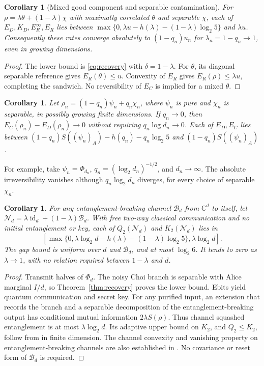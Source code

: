 \documentclass[11pt]{article}
\newtheorem{corollary}[theorem]{Corollary}
\newcommand{\id}{\operatorname{id}}
\begin{document}
\begin{corollary}[Mixed good component and separable contamination]\label{cor:mixedkey}
For $\rho=\lambda\theta+(1-\lambda)\chi$ with maximally correlated
$\theta$ and separable $\chi$, each of $E_D,K_D,E_R^\infty,E_R$ lies
between $\max\{0,\lambda u-h(\lambda)-(1-\lambda)\log_2 5\}$ and
$\lambda u$. Consequently these rates converge absolutely to
$(1-q_n)u_n$ for $\lambda_n=1-q_n\to1$, even in growing dimensions.
\end{corollary}
\begin{proof}
The lower bound is \eqref{eq:recovery} with $\delta=1-\lambda$.
For $\theta$, its diagonal separable reference gives $E_R(\theta)\le u$.
Convexity of $E_R$ gives $E_R(\rho)\le\lambda u$, completing the
sandwich. No reversibility of $E_C$ is implied for a mixed $\theta$.
\end{proof}

\begin{corollary}\label{cor:separable}
Let $\rho_n=(1-q_n)\psi_n+q_n\chi_n$, where $\psi_n$ is pure and
$\chi_n$ is separable, in possibly growing finite dimensions. If
$q_n\to0$, then $E_C(\rho_n)-E_D(\rho_n)\to0$ without requiring
$q_n\log d_n\to0$. Each of $E_D,E_C$ lies between
$(1-q_n)S((\psi_n)_A)-h(q_n)-q_n\log_2 5$ and
$(1-q_n)S((\psi_n)_A)$.
\end{corollary}
For example, take $\psi_n=\Phi_{d_n}$,
$q_n=(\log_2d_n)^{-1/2}$, and $d_n\to\infty$.
The absolute irreversibility vanishes although $q_n\log_2d_n$ diverges,
for every choice of separable $\chi_n$.

\begin{corollary}\label{cor:ebchannel}
For any entanglement-breaking channel $\mathcal B_d$ from
$\mathbb C^d$ to itself, let
$\mathcal N_d=\lambda\id_d+(1-\lambda)\mathcal B_d$.
With free two-way classical communication and no initial entanglement
or key, each of $Q_2(\mathcal N_d)$ and $K_2(\mathcal N_d)$ lies in
\begin{equation}\label{eq:ebchannel}
 \left[\max\{0,\lambda\log_2d-h(\lambda)-(1-\lambda)\log_2 5\},
       \lambda\log_2d\right].
\end{equation}
The gap bound is uniform over $d$ and $\mathcal B_d$, and at most
$\log_2 6$. It tends to zero as $\lambda\to1$, with no relation
required between $1-\lambda$ and $d$.
\end{corollary}
\begin{proof}
Transmit halves of $\Phi_d$. The noisy Choi branch is separable with
Alice marginal $I/d$, so Theorem~\ref{thm:recovery} proves the lower
bound. Ebits yield quantum communication and secret key.
For any purified input, an extension that records the branch and a
separable decomposition of the entanglement-breaking output has
conditional mutual information $2\lambda S(\rho)$. Thus channel
squashed entanglement is at most $\lambda\log_2d$.
Its adaptive upper bound on $K_2$, and $Q_2\le K_2$, follow from
\cite{dsw} in finite dimension. The channel convexity and vanishing
property on entanglement-breaking channels are also established in
\cite[Sections III.B--C]{gew}. No covariance or reset form of
$\mathcal B_d$ is required.
\end{proof}
\end{document}
